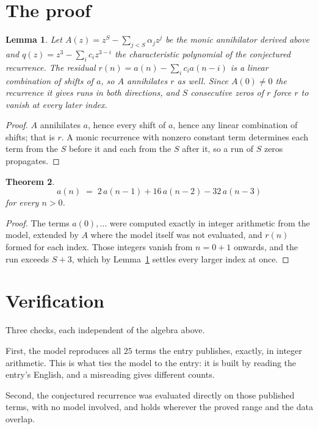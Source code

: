 \documentclass[11pt,a4paper]{article}
\theoremstyle{plain}
\newtheorem{theorem}{Theorem}
\newtheorem{lemma}[theorem]{Lemma}
\theoremstyle{definition}
\begin{document}
\section{The proof}

\begin{lemma}\label{lem:crit}
Let $A(z)=z^S-\sum_{j<S}\alpha_jz^{j}$ be the monic annihilator derived above and
$q(z)=z^{3}-\sum_ic_iz^{3-i}$ the characteristic polynomial of the conjectured
recurrence. The residual $r(n)=a(n)-\sum_ic_ia(n-i)$ is a linear combination of shifts of $a$,
so $A$ annihilates $r$ as well. Since $A(0)\ne0$ the recurrence it gives runs in both
directions, and $S$ consecutive zeros of $r$ force $r$ to vanish at every later index.
\end{lemma}

\begin{proof}
$A$ annihilates $a$, hence every shift of $a$, hence any linear combination of shifts; that is
$r$. A monic recurrence with nonzero constant term determines each term from the $S$ before it
and each from the $S$ after it, so a run of $S$ zeros propagates.
\end{proof}

\begin{theorem}
\[
a(n)\;=\;2\,a(n-1) + 16\,a(n-2) - 32\,a(n-3)
\]
for every $n>0$.
\end{theorem}

\begin{proof}
The terms $a(0),\dots$ were computed exactly in integer arithmetic from the model, extended by
$A$ where the model itself was not evaluated, and $r(n)$ formed for each index. Those integers
vanish from $n=0+1$ onwards, and the run exceeds $S+3$, which by
Lemma~\ref{lem:crit} settles every larger index at once.
\end{proof}

\section{Verification}

Three checks, each independent of the algebra above.

First, the model reproduces all $25$ terms the entry publishes, exactly, in integer
arithmetic. This is what ties the model to the entry: it is built by reading the entry's
English, and a misreading gives different counts.

Second, the conjectured recurrence was evaluated directly on those published terms, with no
model involved, and holds wherever the proved range and the data overlap.
\end{document}
